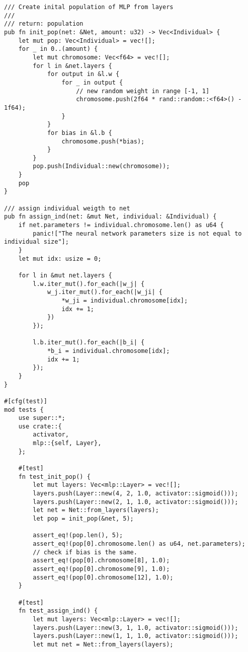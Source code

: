 \begin{code}
\begin{verbatim}
/// Create inital population of MLP from layers
///
/// return: population
pub fn init_pop(net: &Net, amount: u32) -> Vec<Individual> {
    let mut pop: Vec<Individual> = vec![];
    for _ in 0..(amount) {
        let mut chromosome: Vec<f64> = vec![];
        for l in &net.layers {
            for output in &l.w {
                for _ in output {
                    // new random weight in range [-1, 1]
                    chromosome.push(2f64 * rand::random::<f64>() - 1f64);
                }
            }
            for bias in &l.b {
                chromosome.push(*bias);
            }
        }
        pop.push(Individual::new(chromosome));
    }
    pop
}

/// assign individual weigth to net
pub fn assign_ind(net: &mut Net, individual: &Individual) {
    if net.parameters != individual.chromosome.len() as u64 {
        panic!["The neural network parameters size is not equal to individual size"];
    }
    let mut idx: usize = 0;

    for l in &mut net.layers {
        l.w.iter_mut().for_each(|w_j| {
            w_j.iter_mut().for_each(|w_ji| {
                *w_ji = individual.chromosome[idx];
                idx += 1;
            })
        });

        l.b.iter_mut().for_each(|b_i| {
            *b_i = individual.chromosome[idx];
            idx += 1;
        });
    }
}

#[cfg(test)]
mod tests {
    use super::*;
    use crate::{
        activator,
        mlp::{self, Layer},
    };

    #[test]
    fn test_init_pop() {
        let mut layers: Vec<mlp::Layer> = vec![];
        layers.push(Layer::new(4, 2, 1.0, activator::sigmoid()));
        layers.push(Layer::new(2, 1, 1.0, activator::sigmoid()));
        let net = Net::from_layers(layers);
        let pop = init_pop(&net, 5);

        assert_eq!(pop.len(), 5);
        assert_eq!(pop[0].chromosome.len() as u64, net.parameters);
        // check if bias is the same.
        assert_eq!(pop[0].chromosome[8], 1.0);
        assert_eq!(pop[0].chromosome[9], 1.0);
        assert_eq!(pop[0].chromosome[12], 1.0);
    }

    #[test]
    fn test_assign_ind() {
        let mut layers: Vec<mlp::Layer> = vec![];
        layers.push(Layer::new(3, 1, 1.0, activator::sigmoid()));
        layers.push(Layer::new(1, 1, 1.0, activator::sigmoid()));
        let mut net = Net::from_layers(layers);


\end{verbatim}
\end{code}

